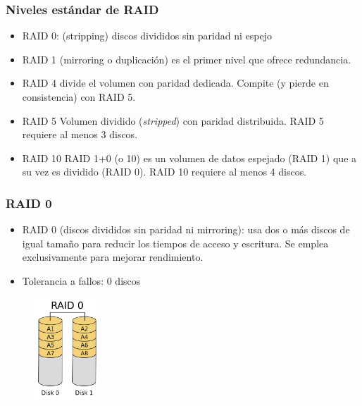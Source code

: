 \documentclass{beamer}
\begin{document}
\begin{frame}
  \frametitle{Niveles estándar de RAID}

  \begin{itemize}
    \item \alert{RAID 0}: (\alert{stripping}) discos divididos sin paridad ni espejo
    \item \alert{RAID 1} (\alert{mirroring} o duplicación) es el primer nivel que ofrece redundancia.
    \item \alert{RAID 4} divide el volumen con paridad dedicada. Compite (y pierde en consistencia) con RAID 5.
    \item \alert{RAID 5} Volumen dividido (\textit{stripped}) con paridad distribuida. RAID 5 requiere al menos 3 discos.
    \item \alert{RAID 10} RAID 1+0 (o 10) es un volumen de datos espejado (RAID 1) que a su vez es dividido (RAID 0). RAID 10 requiere al menos 4 discos.
  \end{itemize}
\end{frame}

\begin{frame}
  \frametitle{RAID 0}

  \begin{itemize}
    \item \alert{RAID 0} (discos divididos sin paridad ni \alert{mirroring}): usa dos o más discos de igual tamaño para reducir los tiempos de acceso y escritura. Se emplea exclusivamente para mejorar rendimiento.
    \item Tolerancia a fallos: 0 discos
  \end{itemize}

\begin{figure}[h]
\begin{center}
  \includegraphics[width=2.5cm]{figs/RAID_0.png}
\end{center}
\end{figure}

\end{frame}
\end{document}
